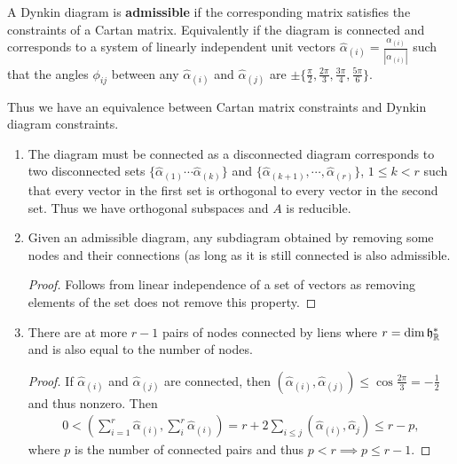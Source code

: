 \begin{definition}
     A Dynkin diagram is \textbf{admissible} if the corresponding matrix satisfies the constraints of a Cartan matrix. Equivalently if the diagram is connected and corresponds to a system of linearly independent unit vectors $\hat{\alpha}_{\left( i \right) } = \frac{\alpha_{\left( i \right) }}{\left| \alpha_{\left( i \right) } \right| }$ such that the angles $\phi_{ij}$ between any $\hat{\alpha}_{\left( i \right) }$ and $\hat{\alpha}_{\left( j \right) }$ are $\pm \{\frac{\pi}{2}, \frac{2\pi}{3}, \frac{3\pi}{4}, \frac{5\pi}{6}\} $.
 \end{definition}

 Thus we have an equivalence between Cartan matrix constraints and Dynkin diagram constraints.
 \begin{enumerate}[label=\roman*)]
     \item The diagram must be connected as a disconnected diagram corresponds to two disconnected sets $\{\hat{\alpha}_{\left( 1 \right) } \cdots \hat{\alpha}_{\left( k \right) }\} $ and $\{\hat{\alpha}_{\left( k + 1 \right) }, \cdots, \hat{\alpha}_{\left( r \right) }\}$, $1 \leq k < r$ such that every vector in the first set is orthogonal to every vector in the second set. Thus we have orthogonal subspaces and $A$ is reducible.
     \item 
         \begin{claim}
             Given an admissible diagram, any subdiagram obtained by removing some nodes and their connections (as long as it is still connected is also admissible.
         \end{claim}
         \begin{proof}
             Follows from linear independence of a set of vectors as removing elements of the set does not remove this property.
         \end{proof}
         \item
             \begin{claim}
                 There are at more $r -1$ pairs of nodes connected by liens where $r = \dim \mathfrak{h}^{*}_{\mathbb{R}}$ and is also equal to the number of nodes.
             \end{claim}
             \begin{proof}
                 If $\hat{\alpha}_{\left( i \right) }$ and $\hat{\alpha}_{\left( j \right) }$ are connected, then $\left( \hat{\alpha}_{\left( i \right) }, \hat{\alpha}_{\left( j \right) } \right) \leq \cos \frac{2\pi}{3} = -\frac{1}{2}$ and thus nonzero. Then
                 \begin{align}
                     0 < \left( \sum_{i=1}^{r}  \hat{\alpha}_{\left( i \right) }, \sum_{i}^{r}  \hat{\alpha}_{\left( i \right) } \right) = r + 2 \sum_{i \leq j}^{}  \left( \hat{\alpha}_{\left( i \right) }, \hat{\alpha}_{j} \right)   \leq r - p
                 ,\end{align}
                 where $p$ is the number of connected pairs and thus $p < r \implies p \leq r - 1$.


\end{proof}
\end{enumerate}

